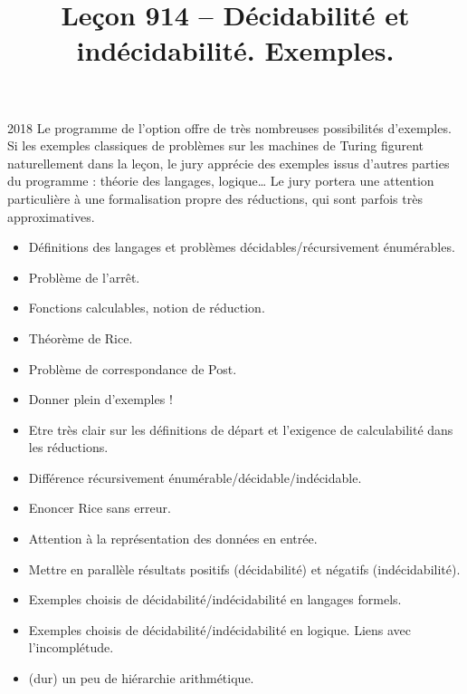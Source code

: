 \documentclass{agregfiche}
\title{Leçon 914 -- Décidabilité et indécidabilité. Exemples.}
\begin{document}
\maketitle

\secrapports

\begin{rapport}{2018}
Le programme de l'option offre de très nombreuses possibilités d'exemples. Si les exemples classiques de problèmes sur les machines de Turing figurent naturellement dans la leçon, le jury apprécie des exemples issus d'autres parties du programme : théorie des langages, logique\dots
Le jury portera une attention particulière à une formalisation propre des réductions, qui sont parfois très approximatives.
\end{rapport}

\secindispensables

\begin{itemize}
\item Définitions des langages et problèmes décidables/récursivement énumérables.
\item Problème de l'arrêt.
\item Fonctions calculables, notion de réduction.
\item Théorème de Rice.
\item Problème de correspondance de Post.
\item Donner plein d'exemples !
\end{itemize}

\secpieges

\begin{itemize}
\item Etre très clair sur les définitions de départ et l'exigence de calculabilité dans les réductions.
\item Différence récursivement énumérable/décidable/indécidable.
\item Enoncer Rice sans erreur.
\item Attention à la représentation des données en entrée.
\end{itemize}


\secidees
\begin{itemize}
\item Mettre en parallèle résultats positifs (décidabilité) et négatifs (indécidabilité).
\item Exemples choisis de décidabilité/indécidabilité en langages formels.
\item Exemples choisis de décidabilité/indécidabilité en logique. Liens avec l'incomplétude.
\item (dur) un peu de hiérarchie arithmétique.
\end{itemize}
\end{document}
